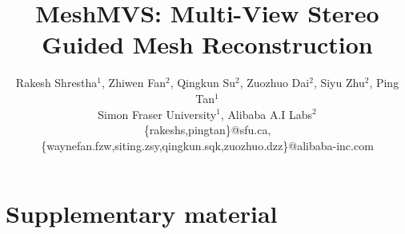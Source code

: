 \documentclass[10pt,twocolumn,letterpaper]{article}
\begin{document}
\title{MeshMVS: Multi-View Stereo Guided Mesh Reconstruction}

\author{
    \small
    Rakesh Shrestha$^{1}$, Zhiwen Fan$^{2}$, Qingkun Su$^{2}$, Zuozhuo Dai$^{2}$, Siyu Zhu$^{2}$, Ping Tan$^{1}$ \\
    \normalsize{Simon Fraser University$^{1}$},
    \normalsize{Alibaba A.I Labs$^{2}$} \\
    \scriptsize{\{rakeshs,pingtan\}@sfu.ca, \{waynefan.fzw,siting.zsy,qingkun.sqk,zuozhuo.dzz\}@alibaba-inc.com}
}

\maketitle
\ificcvfinal\thispagestyle{empty}\fi

\newcommand{\todo}[1]{{\textcolor{red}{\bf [#1]}}}

\newcommand{\figref}[1]{Figure~\ref{fig:#1}}
\newcommand{\tabref}[1]{Table~\ref{tab:#1}}
\newcommand{\equref}[1]{Equation~(\ref{equ:#1})}
\newcommand{\secref}[1]{Section~\ref{sec:#1}}
\newcommand{\subsecref}[1]{Sub-section~\ref{subsec:#1}}
\newcommand{\tableref}[1]{Table~\ref{table:#1}}








{\small


}

\appendix
\section*{Supplementary material}



\end{document}
